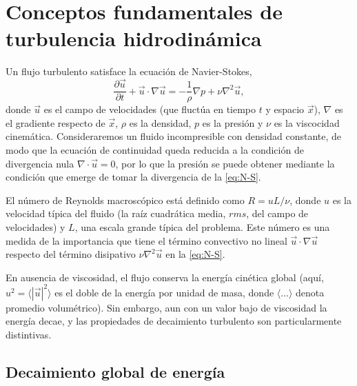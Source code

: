 

\section{Conceptos fundamentales de turbulencia hidrodi\-námica}\label{sec:turbulenciaHD}
Un flujo turbulento satisface la ecuación de Navier-Stokes\cite{batchelor_theory_1953},
\begin{equation}\label{eq:N-S}
  \frac{\partial \vec{u}}{\partial t} + \vec{u}\cdot\nabla\vec{u} =
  -\frac{1}{\rho}\nabla p + \nu\nabla^2 \vec{u},
\end{equation}
donde $\vec{u}$ es el campo de velocidades (que fluctúa en tiempo $t$
y espacio $\vec{x}$), $\nabla$ es el gradiente respecto de $\vec{x}$,
$\rho$ es la densidad, $p$ es la presión y $\nu$ es la viscocidad
cinemática. Consideraremos un fluido incompresible con densidad
constante, de modo que la ecuación de continuidad queda reducida a la
condición de divergencia nula $\nabla\cdot\vec{u} = 0$, por lo que la
presión se puede obtener mediante la condición que emerge de tomar la
divergencia de la \cref{eq:N-S}.

El número de Reynolds macroscópico está definido como $R = uL/\nu$,
donde $u$ es la velocidad típica del fluido (la raíz cuadrática media,
$rms$, del campo de velocidades) y $L$, una escala grande típica del
problema. Este número es una medida de la importancia que
tiene el término convectivo no lineal $\vec{u}\cdot\nabla\vec{u}$
respecto del término disipativo $\nu\nabla^2 \vec{u}$ en la
\cref{eq:N-S}.

En ausencia de viscosidad, el flujo conserva la energía cinética
global (aquí, $u^2 = \langle \left|\vec{u}\right|^2\rangle$ es el
doble de la energía por unidad de masa, donde $\langle ... \rangle$
denota promedio volumétrico). Sin embargo, aun con un valor bajo de
viscosidad la energía decae, y las propiedades de decaimiento
turbulento son particularmente distintivas.


\subsection{Decaimiento global de energía}

